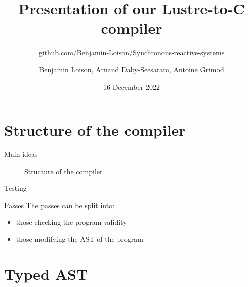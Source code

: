 \documentclass{beamer}
\begin{document}
\title{Presentation of our Lustre-to-C compiler}
\subtitle{github.com/Benjamin-Loison/Synchronous-reactive-systems}
\date{16 December 2022}
\author{Benjamin Loison, Arnaud Daby-Seesaram, Antoine Grimod}

\frame{\titlepage}

\section{Structure of the compiler}
\begin{frame}{Main ideas}
	\begin{figure}
		\caption{Structure of the compiler}
	\end{figure}
\end{frame}

\begin{frame}{Testing}
	\begin{block}{Passes}
		The passes can be split into:
		\begin{itemize}
			\item those checking the program validity
			\item those modifying the AST of the program
		\end{itemize}
	\end{block}
\end{frame}

\section{Typed AST}
\end{document}
